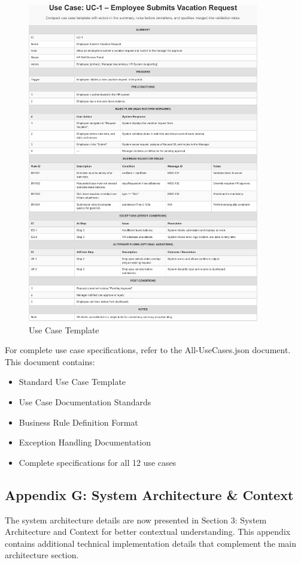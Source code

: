 \documentclass[12pt,a4paper]{article}
\begin{document}
\begin{figure}[H]
\centering
\includegraphics[width=0.9\textwidth]{Use-Cases/Use-Case-Template/Use-Case-Template-1.png}
\caption{Use Case Template}
\label{fig:use-case-template}
\end{figure}

For complete use case specifications, refer to the All-UseCases.json document. This document contains:

\begin{itemize}
    \item Standard Use Case Template
    \item Use Case Documentation Standards
    \item Business Rule Definition Format
    \item Exception Handling Documentation
    \item Complete specifications for all 12 use cases
\end{itemize}

\subsection{Appendix G: System Architecture \& Context}
The system architecture details are now presented in Section 3: System Architecture and Context for better contextual understanding. This appendix contains additional technical implementation details that complement the main architecture section.
\end{document}

